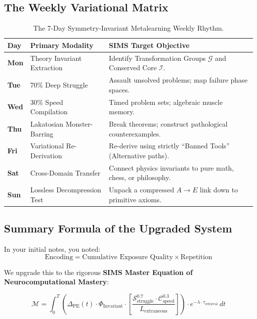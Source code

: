 \documentclass[11pt,a4paper]{article}
\begin{document}
\subsection{The Weekly Variational Matrix}
\begin{table}[h!]
\centering
\small
\begin{tabular}{@{}lll@{}}
\toprule
\textbf{Day} & \textbf{Primary Modality} & \textbf{SIMS Target Objective} \\ \midrule
\textbf{Mon} & Theory Invariant Extraction & Identify Transformation Groups $\mathcal{G}$ and Conserved Core $\mathcal{I}$. \\
\textbf{Tue} & 70\% Deep Struggle & Assault unsolved problems; map failure phase spaces. \\
\textbf{Wed} & 30\% Speed Compilation & Timed problem sets; algebraic muscle memory. \\
\textbf{Thu} & Lakatosian Monster-Barring & Break theorems; construct pathological counterexamples. \\
\textbf{Fri} & Variational Re-Derivation & Re-derive using strictly ``Banned Tools'' (Alternative paths). \\
\textbf{Sat} & Cross-Domain Transfer & Connect physics invariants to pure math, chess, or philosophy. \\
\textbf{Sun} & Lossless Decompression Test & Unpack a compressed $A \to E$ link down to primitive axioms. \\ \bottomrule
\end{tabular}
\caption{The 7-Day Symmetry-Invariant Metalearning Weekly Rhythm.}
\end{table}

\subsection{Summary Formula of the Upgraded System}
In your initial notes, you noted:
\[
\text{Encoding} = \text{Cumulative Exposure Quality} \times \text{Repetition}
\]

We upgrade this to the rigorous \textbf{SIMS Master Equation of Neurocomputational Mastery}:

\begin{equation}
    \mathcal{M} = \int_{0}^{T} \left( \Delta_{\text{PE}}(t) \cdot \Phi_{\text{Invariant}} \cdot \left[ \frac{\mathcal{S}_{\text{struggle}}^{0.7} \cdot \mathcal{C}_{\text{speed}}^{0.3}}{L_{\text{extraneous}}} \right] \right) \cdot e^{-\lambda \cdot \tau_{\text{retrieval}}} \, dt
\end{equation}
\end{document}
